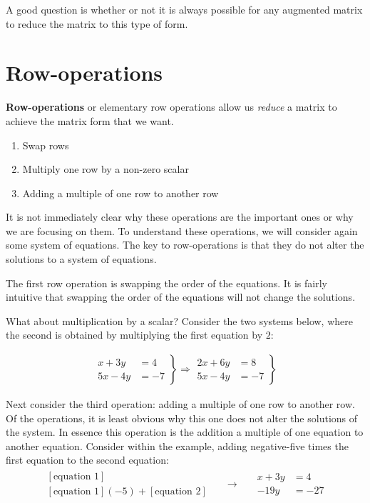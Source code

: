 \documentclass[11pt]{article}
\newcommand{\keyphrase}{\textbf}
\begin{document}
A good question is whether or not it is always possible for any augmented matrix to reduce the matrix to this type of form.

\section*{Row-operations}
\keyphrase{Row-operations} or elementary row operations allow us \emph{reduce} a matrix to achieve the matrix form that we want.
\begin{enumerate}
\item{
Swap rows
}
\item{
Multiply one row by a non-zero scalar
}
\item{
Adding a multiple of one row to another row
}
\end{enumerate}
It is not immediately clear why these operations are the important ones or why we are focusing on them. To understand these operations, we will consider again some system of equations. The key to row-operations is that they do not alter the solutions to a system of equations.

The first row operation is swapping the order of the equations. It is fairly intuitive that swapping the order of the equations will not change the solutions.

What about multiplication by a scalar? Consider the two systems below, where the second is obtained by multiplying the first equation by $2$:

\begin{align*}
\left.
\begin{aligned}
x + 3y &= 4
\\
5x - 4y &= -7
\end{aligned}
\right\}
\Longrightarrow
\left.
\begin{aligned}
2x + 6y &= 8
\\
5x - 4y &= -7
\end{aligned}
\right\}
\end{align*}

Next consider the third operation: adding a multiple of one row to another row. Of the operations, it is least obvious why this one does not alter the solutions of the system. In essence this operation is the addition a multiple of one equation to another equation. Consider within the example, adding negative-five times the first equation to the second equation:
\begin{align*}
\begin{aligned}
\left[\text{equation 1}\right]
\\
\left[\text{equation 1}\right] (-5) + \left[\text{equation 2}\right]
\end{aligned}
&&
\longrightarrow
&&
\begin{aligned}
x + 3y &= 4
\\
-19y &= -27
\end{aligned}
\end{align*}
\end{document}
